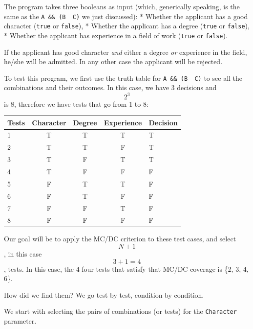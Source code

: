 The program takes three booleans as input (which, generically speaking,
is the same as the \texttt{A\ \&\&\ (B\ \textbar{}\textbar{}\ C)} we
just discussed): * Whether the applicant has a good character
(\texttt{true} or \texttt{false}), * Whether the applicant has a degree
(\texttt{true} or \texttt{false}), * Whether the applicant has
experience in a field of work (\texttt{true} or \texttt{false}).

If the applicant has good character \emph{and} either a degree \emph{or}
experience in the field, he/she will be admitted. In any other case the
applicant will be rejected.

To test this program, we first use the truth table for
\texttt{A\ \&\&\ (B\ \textbar{}\textbar{}\ C)} to see all the
combinations and their outcomes. In this case, we have 3 decisions and
\[2^3\] is 8, therefore we have tests that go from 1 to 8:

\begin{longtable}[]{@{}lcccl@{}}
\toprule
Tests & Character & Degree & Experience & Decision\tabularnewline
\midrule
\endhead
1 & T & T & T & T\tabularnewline
2 & T & T & F & T\tabularnewline
3 & T & F & T & T\tabularnewline
4 & T & F & F & F\tabularnewline
5 & F & T & T & F\tabularnewline
6 & F & T & F & F\tabularnewline
7 & F & F & T & F\tabularnewline
8 & F & F & F & F\tabularnewline
\bottomrule
\end{longtable}

Our goal will be to apply the MC/DC criterion to these test cases, and
select \[N+1\], in this case \[3+1=4\], tests. In this case, the 4 four
tests that satisfy that MC/DC coverage is \{2, 3, 4, 6\}.

How did we find them? We go test by test, condition by condition.

We start with selecting the pairs of combinations (or tests) for the
\texttt{Character} parameter.

